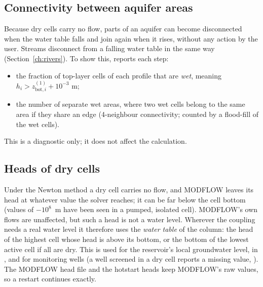 \subsection{Connectivity between aquifer areas}
Because dry cells carry no flow, parts of an aquifer can become disconnected when the water table falls and join
again when it rises, without any action by the user. Streams disconnect from a falling water table in the same way
(Section~\ref{ch:rivers}). To show this,  reports each step:
\begin{itemize}
\item the fraction of top-layer cells of each profile that are \emph{wet}, meaning $h_i>z^{(1)}_{\mathrm{bot},i}+10^{-3}$ m;
\item the number of separate wet areas, where two wet cells belong to the same area if they share an edge
(4-neighbour connectivity; counted by a flood-fill of the wet cells).
\end{itemize}
This is a diagnostic only; it does not affect the calculation.

\subsection{Heads of dry cells}
Under the Newton method a dry cell carries no flow, and MODFLOW leaves its head at whatever value the solver reaches; it
can be far below the cell bottom (values of $-10^{8}$~m have been seen in a pumped, isolated cell). MODFLOW's own flows are
unaffected, but such a head is not a water level. Wherever the coupling needs a real water level it therefore uses the \emph{water table} of the column: the head of the
highest cell whose head is above its bottom, or the bottom of the lowest active cell if all are dry. This is used for the
reservoir's local groundwater level, in , and for monitoring wells (a well screened in a dry cell
reports a missing value, ). The MODFLOW head file and the hotstart heads keep
MODFLOW's raw values, so a restart continues exactly.

